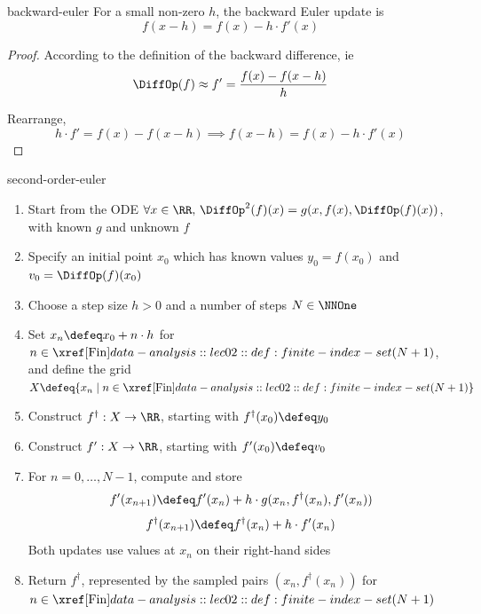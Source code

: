 \documentclass[12pt]{article}
\numberwithin{figure}{section}
\begin{document}
\begin{conv}{backward-euler}
For a small non-zero $h$, the backward Euler update is
\[f(x-h) = f(x) - h \cdot f'(x)\]
\end{conv}

\begin{proof}
According to the definition of the backward difference, ie 
\[\DiffOp(f) \approx f' = \frac{f(x)-f(x-h)}{h}\] 

Rearrange,
\[h \cdot f' = f(x)-f(x-h) \implies f(x-h) = f(x) - h \cdot f'(x)\]  
\end{proof}


\todo[Solve x'=-x with x(0)=1 and compare with exp(-t) using several time steps]

\begin{conv}{second-order-euler}
\begin{enumerate}[nosep]
\item Start from the ODE
  $\forall x\in\RR,\,\DiffOp^2(f)(x)=g(x,f(x),\DiffOp(f)(x))$,
  with known $g$ and unknown $f$
\item Specify an initial point $x_0$ which has known values $y_0=f(x_0)$ and $v_0=\DiffOp(f)(x_0)$ 
\item Choose a step size $h>0$ and a number of steps $N\in\NNOne$
\item Set $x_n\defeq x_0+n\cdot h$ for $n\in\Fin(N+1)$, and define
  the grid $X\defeq\{x_n\mid n\in\Fin(N+1)\}$
\item Construct $f^\dagger:X\to\RR$, starting with
  $f^\dagger(x_0)\defeq y_0$
  \item Construct $f':X\to\RR$, starting with
  $f'(x_0)\defeq v_0$
\item For $n=0,\ldots,N-1$, compute and store
  \[
    f'(x_{n+1})\defeq f'(x_n)
      +h\cdot g(x_n,f^\dagger(x_n),f'(x_n))
  \]
  \[
  f^{\dagger}(x_{n+1})\defeq f^{\dagger}(x_{n}) + h\cdot f'(x_n)
  \]
  Both updates use values at $x_n$ on their right-hand sides
\item Return $f^\dagger$, represented by the sampled pairs
  $(x_n,f^\dagger(x_n))$ for $n\in\Fin(N+1)$
\end{enumerate}
\end{conv}
\end{document}
